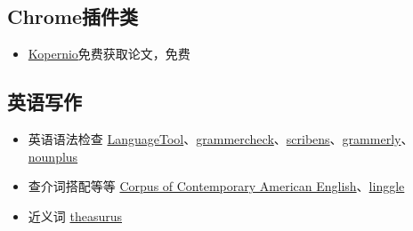 \documentclass[UTF8,oneside]{ctexbook}
\begin{document}
\subsection{Chrome插件类}
\begin{itemize}
	\item \href{https://kopernio.com}{Kopernio}\quad 免费获取论文，免费
\end{itemize}

\subsection{英语写作}
\begin{itemize}
	\item 英语语法检查 \href{https://languagetool.org}{LanguageTool}、\href{https://www.grammarcheck.net}{grammercheck}、\href{https://www.scribens.com}{scribens}、\href{https://www.grammarly.com}{grammerly}、\href{https://www.nounplus.net}{nounplus}
	\item 查介词搭配等等 \href{https://www.english-corpora.org/coca/}{ Corpus of Contemporary American English}、\href{https://www.lintcode.com}{linggle}
	\item 近义词 \href{https://www.thesaurus.com}{theasurus}
\end{itemize}
\end{document}
